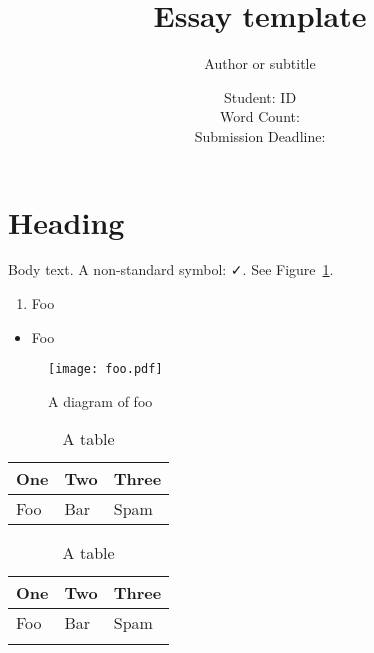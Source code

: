 \documentclass[12pt,a4paper]{article}
\title{Essay template}
\author{Author or subtitle}
\date{Student: ID \\ Word Count:  \\ Submission Deadline: }
\begin{document}
\maketitle

\section{Heading}

Body text. A non-standard symbol: {\sym ✓}. See Figure~\ref{fig:foo}.

\begin{enumerate}
    \item Foo
\end{enumerate}

\begin{itemize}
    \item Foo
\end{itemize}

\begin{figure}[!hb]
    \centering
    \texttt{[image: foo.pdf]}
    \caption{A diagram of foo}
    \label{fig:foo}
\end{figure}

\begin{table}[!hb]
    \begin{tabu} to \linewidth{X[2,l] X[c] X[r]}
        \toprule
        \rowfont\bfseries One & Two & Three \\
        \midrule
        Foo & Bar & Spam \\
        \bottomrule
    \end{tabu}
    \caption{\label{tbl:foo}A table}
\end{table}

\begin{longtabu} to \linewidth{X[2,l] X[c] X[r]}
    \toprule
    \rowfont\bfseries One & Two & Three \\
    \midrule
    \endhead
    Foo & Bar & Spam \\
    \bottomrule
    \caption{\label{tbl:foo}A table}
\end{longtabu}

\pagebreak



\end{document}
